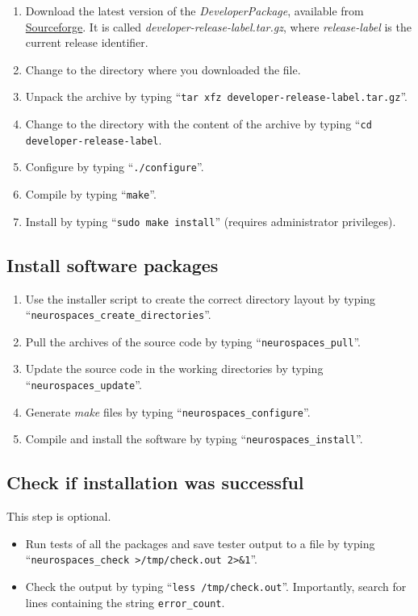 \documentclass[12pt]{article}
\begin{document}
\begin{enumerate}
   \item Download the latest version of the {\it DeveloperPackage}, available from \href{http://sourceforge.net/projects/neurospaces/files/}{Sourceforge}. It is called {\it developer-release-label.tar.gz}, where {\it release-label} is the current release identifier.
   \item Change to the directory where you downloaded the file.
   \item Unpack the archive by typing ``{\tt tar xfz developer-release-label.tar.gz}''.
   \item Change to the directory with the content of the archive by typing ``{\tt cd developer-release-label}.
   \item Configure by typing ``{\tt ./configure}''.
   \item Compile by typing ``{\tt make}''.
   \item Install by typing ``{\tt sudo make install}''  (requires administrator privileges). 
\end{enumerate}

\subsection*{Install software packages}

\begin{enumerate}
   \item Use the installer script to create the correct directory layout by typing ``{\tt neurospaces\_create\_directories}''.
   \item Pull the archives of the source code by typing ``{\tt neurospaces\_pull}''.
   \item Update the source code in the working directories by typing ``{\tt neurospaces\_update}''.
   \item Generate {\it make} files by typing ``{\tt neurospaces\_configure}''.
   \item Compile and install the software by typing ``{\tt neurospaces\_install}''.
\end{enumerate}

\subsection*{Check if installation was successful}

This step is optional.
\begin{itemize}
   \item[] Run tests of all the packages and save tester output to a file  by typing ``{\tt neurospaces\_check >/tmp/check.out 2>\&1}''.
   \item[] Check the output by typing ``{\tt less /tmp/check.out}''. Importantly, search for lines containing the string {\tt error\_count}.
\end{itemize}
 
\end{document}
